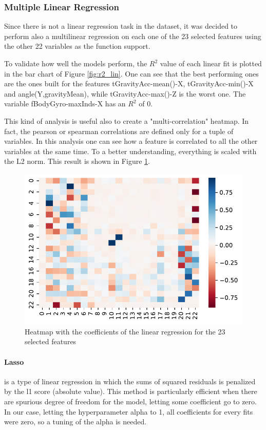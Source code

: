 \documentclass[10pt, a4paper, twocolumn]{article}
\begin{document}
\subsubsection*{Multiple Linear Regression}

Since there is not a linear regression task in the dataset, it was decided to perform also a multilinear regression on each one of the 23 selected features using the other 22 variables as the function support. 

To validate how well the models perform, the $R^2$ value of each linear fit is plotted in the bar chart of Figure \ref{fig:r2_lin}. One can see that the best performing ones are the ones built for the features tGravityAcc-mean()-X, tGravityAcc-min()-X and angle(Y,gravityMean), while tGravityAcc-max()-Z is the worst one. The variable fBodyGyro-maxInds-X has an $R^2$ of 0.

This kind of analysis is useful also to create a "multi-correlation" heatmap. In fact, the pearson or spearman correlations are defined only for a tuple of variables. In this analysis one can see how a feature is correlated to all the other variables at the same time. To a better understanding, everything is scaled with the L2 norm. This result is shown in Figure \ref{fig:lin_heatmap}.

\begin{figure}
    \centering
    \includegraphics[width=0.60\columnwidth]{lin_heatmap.pdf}
    \caption{Heatmap with the coefficients of the linear regression for the 23 selected features}
    \label{fig:lin_heatmap}
\end{figure}

\paragraph{Lasso} is a type of linear regression in which the sums of squared residuals is penalized by the l1 score (absolute value). This method is particularly efficient when there are spurious degree of freedom for the model, letting some coefficient go to zero. In our case, letting the hyperparameter alpha to 1, all coefficients for every fits were zero, so a tuning of the alpha is needed. 
\end{document}
